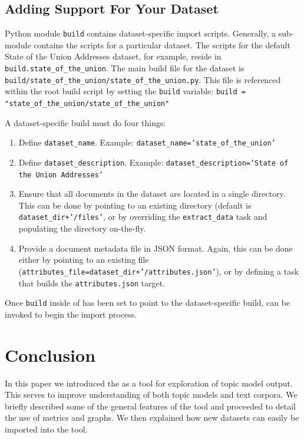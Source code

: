 \documentclass[11pt]{article}
\begin{document}
\subsection{Adding Support For Your Dataset}
Python module \texttt{build} contains dataset-specific import scripts.
Generally, a sub-module contains the scripts for a particular dataset. The
scripts for the default State of the Union Addresses dataset, for example,
reside in \texttt{build.state\_\allowbreak{}of\_\allowbreak{}the\_\allowbreak{}union}. The main build file for the dataset
is \texttt{build/\allowbreak{}state\_\allowbreak{}of\_\allowbreak{}the\_\allowbreak{}union/\allowbreak{}state\_\allowbreak{}of\_\allowbreak{}the\_\allowbreak{}union.py}. This file is
referenced within the root \texttt{\buildscript{}} build script by setting the
\texttt{build} variable:
\texttt{build = "state\_\allowbreak{}of\_\allowbreak{}the\_\allowbreak{}union/\allowbreak{}state\_\allowbreak{}of\_\allowbreak{}the\_\allowbreak{}union"}

A dataset-specific build must do four things:
\begin{enumerate}
\item Define \texttt{dataset\_name}.
    \newline Example: \texttt{dataset\_name='state\_of\_the\_union'}
  \item Define \texttt{dataset\_description}.
    \newline Example: \texttt{dataset\_description='State of the Union Addresses'}
  \item Ensure that all documents in the dataset are located in a single directory.
    This can be done by pointing to an existing directory (default is \texttt{dataset\_dir+'/files'}, or by overriding the
    \texttt{extract\_data} task and populating the directory on-the-fly.
  \item Provide a document metadata file in JSON format. Again, this can be done
    either by pointing to an existing file (\texttt{attributes\_\allowbreak{}file=\allowbreak{}dataset\_\allowbreak{}dir\allowbreak{}+\allowbreak{}'/attributes\allowbreak{}.json'}), or by defining a task that builds the \texttt{attributes.json} target.
\end{enumerate}

Once \texttt{build} inside of \texttt{\buildscript{}} has been set to point to
the dataset-specific build, \texttt{\buildscript{}} can be invoked to begin the
import process.

\section{Conclusion}
In this paper we introduced the \toolname{} as a tool for exploration of
topic model output. This serves to improve understanding of both topic models
and text corpora. We briefly described some of the general features of the tool
and proceeded to detail the use of metrics and graphs. We then explained how
new datasets can easily be imported into the tool.
\end{document}
